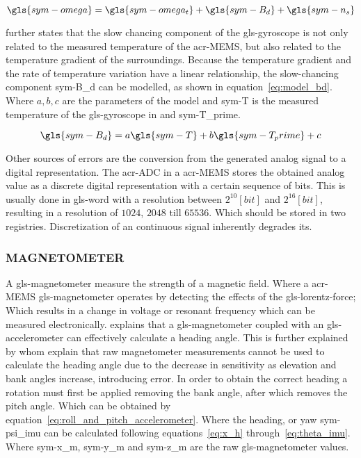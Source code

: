 \begin{equation}
    \label{eq:model_drift_gyro}
    \gls{sym-omega} = \gls{sym-omega_t} + \gls{sym-B_d} + \gls{sym-n_s}
\end{equation}

\citet{abyarjoo_implementing_2015} further states that the slow chancing component of the \gls{gls-gyroscope} is not
only related to the measured temperature of the \gls{acr-MEMS}, but also related to the temperature gradient of the
surroundings. Because the temperature gradient and the rate of temperature variation have a linear relationship, the
slow-chancing component \gls{sym-B_d} can be modelled, as shown in equation~\ref{eq:model_bd}. Where \( a, b, c \) are
the parameters of the model \citet{wei_improved_2006} and \gls{sym-T} is the measured temperature of the
\gls{gls-gyroscope} in  and \gls{sym-T_prime}.

\begin{equation}
    \label{eq:model_bd}
    \gls{sym-B_d} = a\gls{sym-T} + b\gls{sym-T_prime} + c
\end{equation}

Other sources of errors are the conversion from the generated analog signal to a digital representation. The
\gls{acr-ADC} in a \gls{acr-MEMS} stores the obtained analog value as a discrete digital representation with a certain
sequence of bits. This is usually done in \gls{gls-word} with a resolution between \( 2^{10} [bit] \) and \( 2^{16}
[bit] \), resulting in a resolution of \( 1024 \), \( 2048 \) till \( 65536 \). Which should be stored in two
registries. Discretization of an continuous signal inherently degrades its.

\subsubsection{MAGNETOMETER}\label{sec:magnetometer}

A \gls{gls-magnetometer} measure the strength of a magnetic field. Where a \gls{acr-MEMS} \gls{gls-magnetometer}
operates by detecting the effects of the \gls{gls-lorentz-force}; Which results in a change in voltage or resonant
frequency which can be measured electronically. \citet{leccadito_kalman_2013} explains that a \gls{gls-magnetometer}
coupled with an \gls{gls-accelerometer} can effectively calculate a heading angle. This is further explained by
\citet{konvalin_technical_2008} whom explain that raw magnetometer measurements cannot be used to calculate the heading
angle due to the decrease in sensitivity as elevation and bank angles increase, introducing error. In order to obtain
the correct heading a rotation must first be applied removing the bank angle, after which removes the pitch angle. Which
can be obtained by equation~\ref{eq:roll_and_pitch_accelerometer}. Where the heading, or yaw \gls{sym-psi_imu} can be
calculated following equations~\ref{eq:x_h} through~\ref{eq:theta_imu}. Where \gls{sym-x_m}, \gls{sym-y_m} and
\gls{sym-z_m} are the raw \gls{gls-magnetometer} values.

